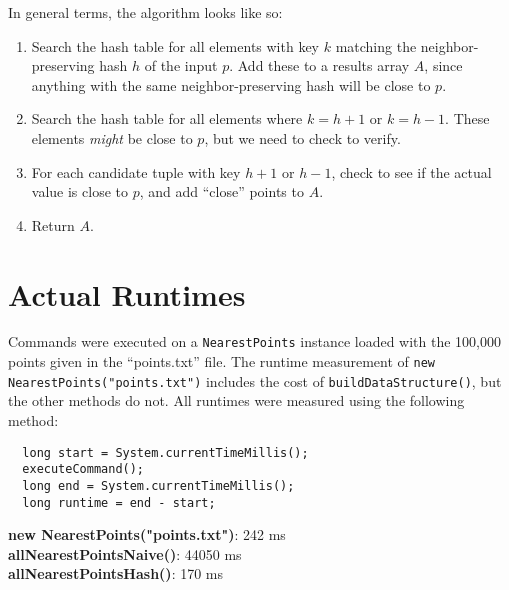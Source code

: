 \documentclass[12pt]{article}
\begin{document}
In general terms, the algorithm looks like so:

\begin{enumerate}
\item Search the hash table for all elements with key $k$ matching the
  neighbor-preserving hash $h$ of the input $p$. Add these to
  a results array $A$, since anything with the same neighbor-preserving
  hash will be close to $p$.
\item Search the hash table for all elements where $k = h+1$ or $k=h-1$.
  These elements \textit{might} be close to $p$, but we need to check
  to verify.
\item For each candidate tuple with key $h+1$ or $h-1$, check to see
  if the actual value is close to $p$, and add ``close'' points to $A$.
  \item Return $A$.
\end{enumerate}




\pagebreak
\section{Actual Runtimes}

Commands were executed on a \lstinline|NearestPoints| instance loaded
with the 100,000 points given in the ``points.txt'' file. The runtime
measurement of \lstinline|new NearestPoints("points.txt")|
includes the cost of \lstinline|buildDataStructure()|, but the other
methods do not. All runtimes were measured using the following method: \\

\begin{lstlisting}
  long start = System.currentTimeMillis();
  executeCommand();
  long end = System.currentTimeMillis();
  long runtime = end - start;
\end{lstlisting}
\bigskip

\textbf{new NearestPoints("points.txt")}: 242 ms \\

\textbf{allNearestPointsNaive()}: 44050 ms \\

\textbf{allNearestPointsHash()}: 170 ms
\end{document}

